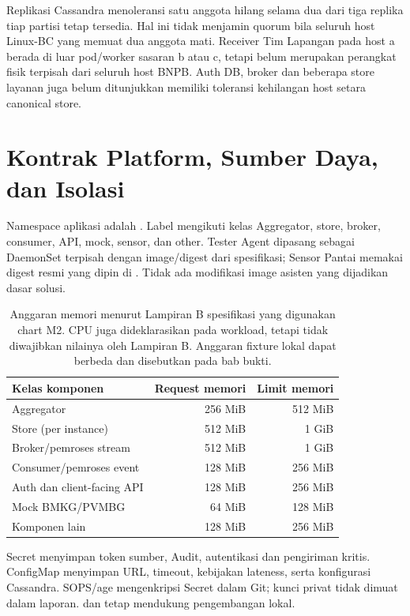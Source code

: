 Replikasi Cassandra menoleransi satu anggota hilang selama dua dari tiga replika tiap partisi tetap tersedia. Hal ini tidak menjamin quorum bila seluruh host Linux-BC yang memuat dua anggota mati. Receiver Tim Lapangan pada host a berada di luar pod/worker sasaran b atau c, tetapi belum merupakan perangkat fisik terpisah dari seluruh host BNPB. Auth DB, broker dan beberapa store layanan juga belum ditunjukkan memiliki toleransi kehilangan host setara canonical store.

\section{Kontrak Platform, Sumber Daya, dan Isolasi}
Namespace aplikasi adalah . Label  mengikuti kelas Aggregator, store, broker, consumer, API, mock, sensor, dan other. Tester Agent dipasang sebagai DaemonSet terpisah dengan image/digest dari spesifikasi; Sensor Pantai memakai digest resmi yang dipin di . Tidak ada modifikasi image asisten yang dijadikan dasar solusi.

\begin{table}[htbp]\centering
\begin{tabularx}{\textwidth}{@{}Yrr@{}}
\toprule Kelas komponen & Request memori & Limit memori\\\midrule
Aggregator & 256 MiB & 512 MiB\\
Store (per instance) & 512 MiB & 1 GiB\\
Broker/pemroses stream & 512 MiB & 1 GiB\\
Consumer/pemroses event & 128 MiB & 256 MiB\\
Auth dan client-facing API & 128 MiB & 256 MiB\\
Mock BMKG/PVMBG & 64 MiB & 128 MiB\\
Komponen lain & 128 MiB & 256 MiB\\\bottomrule
\end{tabularx}
\caption{Anggaran memori menurut Lampiran B spesifikasi yang digunakan chart M2. CPU juga dideklarasikan pada workload, tetapi tidak diwajibkan nilainya oleh Lampiran B. Anggaran fixture lokal dapat berbeda dan disebutkan pada bab bukti.}
\end{table}

Secret menyimpan token sumber, Audit, autentikasi dan pengiriman kritis. ConfigMap menyimpan URL, timeout, kebijakan lateness, serta konfigurasi Cassandra. SOPS/age mengenkripsi Secret dalam Git; kunci privat tidak dimuat dalam laporan.  dan  tetap mendukung pengembangan lokal.

